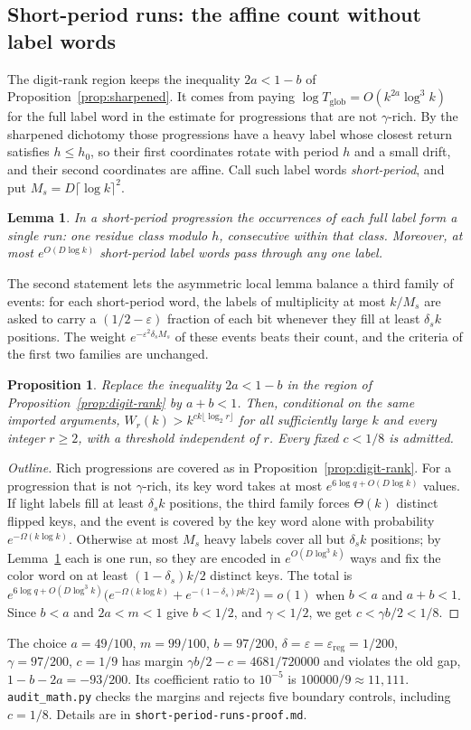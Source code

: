 \documentclass[11pt]{article}
\newtheorem{lemma}{Lemma}
\newtheorem{proposition}{Proposition}
\begin{document}
\subsection{Short-period runs: the affine count without label words}\label{sec:short-period}
The digit-rank region keeps the inequality $2a<1-b$ of
Proposition~\ref{prop:sharpened}. It comes from paying
$\log T_{\mathrm{glob}}=O(k^{2a}\log^3k)$ for the full label word in the
estimate for progressions that are not $\gamma$-rich. By the sharpened
dichotomy those progressions have a heavy label whose closest return
satisfies $h\le h_0$, so their first coordinates rotate with period $h$
and a small drift, and their second coordinates are affine. Call such
label words \emph{short-period}, and put $M_s=D\lceil\log k\rceil^2$.
\begin{lemma}\label{lem:runs}
In a short-period progression the occurrences of each full label form a
single run: one residue class modulo $h$, consecutive within that class.
Moreover, at most $e^{O(D\log k)}$ short-period label words pass through
any one label.
\end{lemma}
The second statement lets the asymmetric local lemma balance a third
family of events: for each short-period word, the labels of multiplicity
at most $k/M_s$ are asked to carry a $(1/2-\varepsilon)$ fraction of each
bit whenever they fill at least $\delta_sk$ positions. The weight
$e^{-\varepsilon^2\delta_sM_s}$ of these events beats their count, and
the criteria of the first two families are unchanged.
\begin{proposition}\label{prop:short-period}
Replace the inequality $2a<1-b$ in the region of
Proposition~\ref{prop:digit-rank} by $a+b<1$. Then, conditional on the
same imported arguments, $W_r(k)>k^{ck\lfloor\log_2r\rfloor}$ for all
sufficiently large $k$ and every integer $r\ge2$, with a threshold
independent of $r$. Every fixed $c<1/8$ is admitted.
\end{proposition}
\begin{proof}[Outline]
Rich progressions are covered as in Proposition~\ref{prop:digit-rank}.
For a progression that is not $\gamma$-rich, its key word takes at most
$e^{6\log q+O(D\log k)}$ values. If light labels fill at least $\delta_sk$
positions, the third family forces $\Theta(k)$ distinct flipped keys, and
the event is covered by the key word alone with probability
$e^{-\Omega(k\log k)}$. Otherwise at most $M_s$ heavy labels cover all but
$\delta_sk$ positions; by Lemma~\ref{lem:runs} each is one run, so they
are encoded in $e^{O(D\log^3k)}$ ways and fix the color word on at least
$(1-\delta_s)k/2$ distinct keys. The total is
$e^{6\log q+O(D\log^3k)}\bigl(e^{-\Omega(k\log k)}+e^{-(1-\delta_s)pk/2}\bigr)=o(1)$
when $b<a$ and $a+b<1$. Since $b<a$ and $2a<m<1$ give $b<1/2$, and
$\gamma<1/2$, we get $c<\gamma b/2<1/8$.
\end{proof}
The choice $a=49/100$, $m=99/100$, $b=97/200$,
$\delta=\varepsilon=\varepsilon_{\mathrm{reg}}=1/200$, $\gamma=97/200$,
$c=1/9$ has margin $\gamma b/2-c=4681/720000$ and violates the old gap,
$1-b-2a=-93/200$. Its coefficient ratio to $10^{-5}$ is
$100000/9\approx11{,}111$. \texttt{audit\_math.py} checks the margins and
rejects five boundary controls, including $c=1/8$. Details are in
\texttt{short-period-runs-proof.md}.
\end{document}
